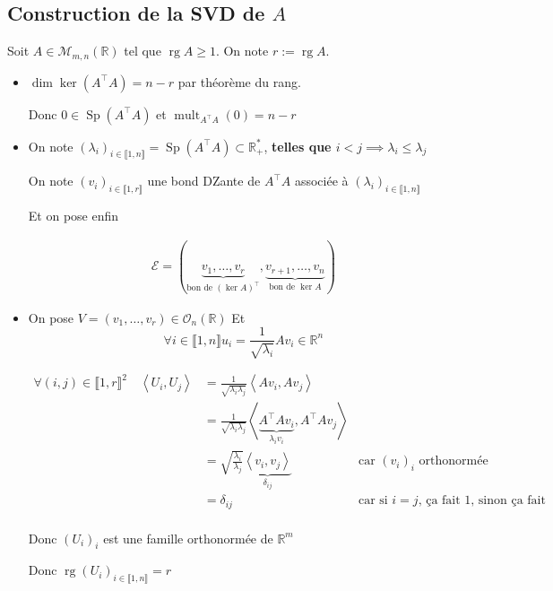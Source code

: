 \documentclass{article}
\newcommand{\mult}{\operatorname{mult}}
\newcommand{\Sp}{\operatorname{Sp}}
\newcommand{\rg}{\operatorname{rg}}
\renewcommand{\dim}{\operatorname{dim}}
\newcommand{\cM}{\mathcal{M}}
\newcommand{\cO}{\mathcal{O}}
\newcommand{\cE}{\mathcal{E}}
\newcommand{\R}{\mathbb{R}}
\begin{document}
\subsection{Construction de la SVD de $A$}

Soit $A \in \cM_{m,n}(\R)$ tel que $\rg A \ge 1$. On note $r := \rg A$.

\begin{itemize}
	\item $\dim \ker (A^\top A) = n - r$ par théorème du rang. 

		Donc $0 \in \Sp(A^\top A)$ et $\mult_{A^\top A}(0) = n -r$
	\item On note $(\lambda_i)_{i\in \llbracket 1, n \rrbracket} = \Sp(A^\top A) \subset \R_+^\ast$, {\bf telles que $i < j \implies \lambda_i \le  \lambda_j$}

		On note $(v_i)_{i\in \llbracket 1, r\rrbracket}$ une bond DZante de $A^\top A$ associée à $(\lambda_i)_{i\in \llbracket 1, n \rrbracket}$

		Et on pose enfin

		\begin{align*}
		\cE = \left(\underbrace{v_1, \ldots, v_r}_{\text{bon de $(\ker A)^\top$}}, \underbrace{v_{r+1}, \ldots, v_n}_{\text{bon de $\ker A$}} \right)
		\end{align*}


		\item 
		On pose $V = (v_1, \ldots, v_r) \in \cO_n(\R)$
		Et \[
			\forall i\in \llbracket 1, n\rrbracket u_i = \frac{1}{\sqrt{\lambda_i} } A v_i \in \R^n 
		\] 

		\begin{align*}
			\forall (i, j) \in \llbracket 1, r \rrbracket^2\quad \left<U_i, U_j \right> &= \frac{1}{\sqrt{\lambda_i \lambda_j} } \left<Av_i, Av_j \right> \\
												    &= \frac{1}{\sqrt{\lambda_i \lambda_j} } \left<\underbrace{A^\top A v_i}_{\lambda_i v_i}, A^\top Av_j \right> \\
												    &= \sqrt{\frac{\lambda_i}{\lambda_j}} \underbrace{\left<v_i, v_j \right>}_{\delta_{ij}} \quad&\text{car $(v_i)_i$ orthonormée} \\
												    &= \delta_{ij} \quad&\text{car si $i=j$, ça fait 1, sinon ça fait 0} \\
		\end{align*}

		Donc $(U_i)_i$ est une famille orthonormée de $\R^m$
	
		Donc $\rg (U_i)_{i\in \llbracket 1, n \rrbracket} = r$


\end{itemize}
\end{document}
